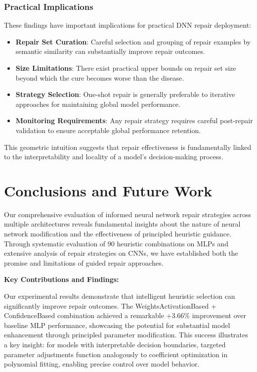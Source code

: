 \documentclass{article}
\begin{document}
\begin{description}
\subsubsection{Practical Implications}

These findings have important implications for practical DNN repair deployment:

\begin{itemize}
	\item \textbf{Repair Set Curation}: Careful selection and grouping of repair examples by semantic similarity can substantially improve repair outcomes.
	\item \textbf{Size Limitations}: There exist practical upper bounds on repair set size beyond which the cure becomes worse than the disease.
	\item \textbf{Strategy Selection}: One-shot repair is generally preferable to iterative approaches for maintaining global model performance.
	\item \textbf{Monitoring Requirements}: Any repair strategy requires careful post-repair validation to ensure acceptable global performance retention.
\end{itemize}

This geometric intuition suggests that repair effectiveness is fundamentally linked to the interpretability and locality of a model's decision-making process.

\section{Conclusions and Future Work}

Our comprehensive evaluation of informed neural network repair strategies across multiple architectures reveals fundamental insights about the nature of neural network modification and the effectiveness of principled heuristic guidance. Through systematic evaluation of 90 heuristic combinations on MLPs and extensive analysis of repair strategies on CNNs, we have established both the promise and limitations of guided repair approaches.

\textbf{Key Contributions and Findings:}

Our experimental results demonstrate that intelligent heuristic selection can significantly improve repair outcomes. The WeightsActivationBased + ConfidenceBased combination achieved a remarkable +3.66\% improvement over baseline MLP performance, showcasing the potential for substantial model enhancement through principled parameter modification. This success illustrates a key insight: for models with interpretable decision boundaries, targeted parameter adjustments function analogously to coefficient optimization in polynomial fitting, enabling precise control over model behavior.


\end{description}
\end{document}
